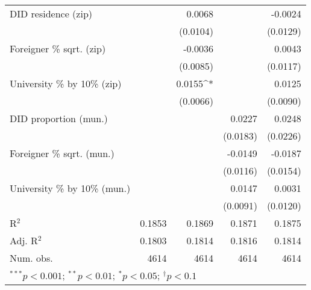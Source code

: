 \begin{tabular}{l D{.}{.}{4.11} D{.}{.}{4.11} D{.}{.}{4.7} D{.}{.}{4.11}}
DID residence (zip)               &                   & 0.0068            &              & -0.0024           \\
                                  &                   & (0.0104)          &              & (0.0129)          \\
Foreigner \% sqrt. (zip)          &                   & -0.0036           &              & 0.0043            \\
                                  &                   & (0.0085)          &              & (0.0117)          \\
University \% by 10\% (zip)       &                   & 0.0155^{*}        &              & 0.0125            \\
                                  &                   & (0.0066)          &              & (0.0090)          \\
DID proportion (mun.)             &                   &                   & 0.0227       & 0.0248            \\
                                  &                   &                   & (0.0183)     & (0.0226)          \\
Foreigner \% sqrt. (mun.)         &                   &                   & -0.0149      & -0.0187           \\
                                  &                   &                   & (0.0116)     & (0.0154)          \\
University \% by 10\% (mun.)      &                   &                   & 0.0147       & 0.0031            \\
                                  &                   &                   & (0.0091)     & (0.0120)          \\
\midrule
R$^2$                             & 0.1853            & 0.1869            & 0.1871       & 0.1875            \\
Adj. R$^2$                        & 0.1803            & 0.1814            & 0.1816       & 0.1814            \\
Num. obs.                         & 4614              & 4614              & 4614         & 4614              \\
\bottomrule
{}
\end{tabular}
